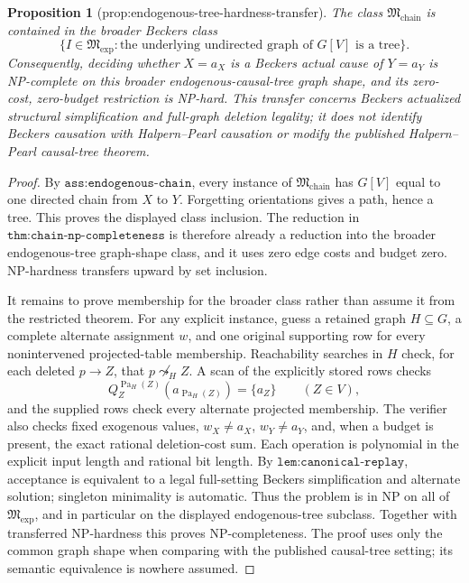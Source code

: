 \documentclass{article}
\newtheorem{proposition}{Proposition}
\begin{document}
\begin{proposition}[prop:endogenous-tree-hardness-transfer]\label{prop:endogenous-tree-hardness-transfer}
The class \(\mathfrak M_{\mathrm{chain}}\) is contained in the broader Beckers class
\[
 \{I\in\mathfrak M_{\mathrm{exp}}:\text{the underlying undirected graph of \(G[V]\) is a tree}\}.
\]
Consequently, deciding whether \(X=a_X\) is a Beckers actual cause of \(Y=a_Y\) is NP-complete on this broader endogenous-causal-tree graph shape, and its zero-cost, zero-budget restriction is NP-hard. This transfer concerns Beckers actualized structural simplification and full-graph deletion legality; it does not identify Beckers causation with Halpern--Pearl causation or modify the published Halpern--Pearl causal-tree theorem.
\end{proposition}
\begin{proof}
By \(\texttt{ass:endogenous-chain}\), every instance of \(\mathfrak M_{\mathrm{chain}}\) has \(G[V]\) equal to one directed chain from \(X\) to \(Y\). Forgetting orientations gives a path, hence a tree. This proves the displayed class inclusion. The reduction in \(\texttt{thm:chain-np-completeness}\) is therefore already a reduction into the broader endogenous-tree graph-shape class, and it uses zero edge costs and budget zero. NP-hardness transfers upward by set inclusion.

It remains to prove membership for the broader class rather than assume it from the restricted theorem. For any explicit instance, guess a retained graph \(H\subseteq G\), a complete alternate assignment \(w\), and one original supporting row for every nonintervened projected-table membership. Reachability searches in \(H\) check, for each deleted \(p\to Z\), that \(p\not\leadsto_H Z\). A scan of the explicitly stored rows checks
\[
 Q_Z^{\operatorname{Pa}_H(Z)}(a_{\operatorname{Pa}_H(Z)})=\{a_Z\}
 \qquad(Z\in V),
\]
and the supplied rows check every alternate projected membership. The verifier also checks fixed exogenous values, \(w_X\ne a_X\), \(w_Y\ne a_Y\), and, when a budget is present, the exact rational deletion-cost sum. Each operation is polynomial in the explicit input length and rational bit length. By \(\texttt{lem:canonical-replay}\), acceptance is equivalent to a legal full-setting Beckers simplification and alternate solution; singleton minimality is automatic. Thus the problem is in NP on all of \(\mathfrak M_{\mathrm{exp}}\), and in particular on the displayed endogenous-tree subclass. Together with transferred NP-hardness this proves NP-completeness. The proof uses only the common graph shape when comparing with the published causal-tree setting; its semantic equivalence is nowhere assumed.
\end{proof}
\end{document}

